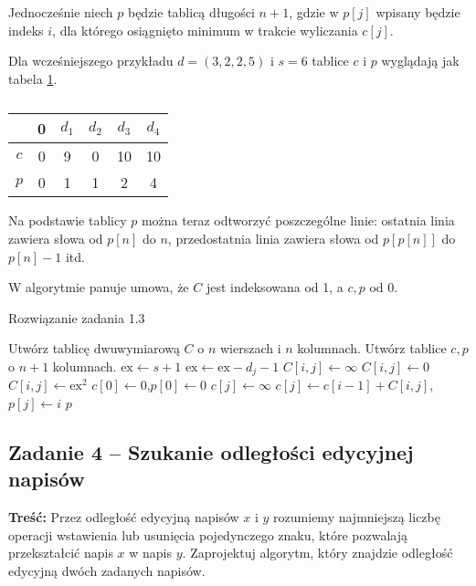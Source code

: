 Jednocześnie niech $p$ będzie tablicą długości $n+1$, gdzie w $p[j]$ wpisany będzie indeks $i$, dla którego osiągnięto minimum w trakcie wyliczania $c[j]$.

Dla wcześniejszego przykładu $d=(3,2,2,5)$ i $s=6$ tablice $c$ i $p$ wyglądają jak tabela \ref{tab_zad13_c}.
\begin{table}[H]
	\centering
	\def\arraystretch{1.25}
	\begin{tabular}{|c|ccccc|}
		\hline & \multicolumn{1}{c|}{0} & \multicolumn{1}{c|}{$d_1$} & \multicolumn{1}{c|}{$d_2$} & \multicolumn{1}{c|}{$d_3$} & \multicolumn{1}{c|}{$d_4$} \\ \hline
		$c$ & 0 & 9 & 0 & 10 & 10 \\ \cline{1-1}
		$p$ & 0 & 1 & 1 & 2 & 4 \\ \cline{1-1}
		\hline
	\end{tabular}
	\caption{}
	\label{tab_zad13_c}
\end{table}

Na podstawie tablicy $p$ można teraz odtworzyć poszczególne linie: ostatnia linia zawiera słowa od $p[n]$ do $n$, przedostatnia linia zawiera słowa od $p[p[n]]$ do $p[n]-1$ itd.

W algorytmie panuje umowa, że $C$ jest indeksowana od 1, a $c,p$ od 0.
\begin{algorithm}[H]
	\caption{Rozwiązanie zadania 1.3}\label{Zadanie13}
	\begin{algorithmic}[1]
			\State Utwórz tablicę dwuwymiarową $C$ o $n$ wierszach i $n$ kolumnach.
			\State Utwórz tablice $c,p$ o $n+1$ kolumnach.
				\State $\textrm{ex}\gets s+1$
					\State $\textrm{ex}\gets \textrm{ex} - d_j - 1$
						\State $C[i,j]\gets\infty$
						\State $C[i,j]\gets0$
					\Else
						\State $C[i,j]\gets\textrm{ex}^2$
					\EndIf
				\EndFor
			\EndFor
			\State $c[0]\gets0$,\quad$p[0]\gets0$
				\State $c[j]\gets\infty$
						\State $c[j]\gets c[i-1]+C[i,j]$,\qquad$p[j]\gets i$
					\EndIf
				\EndFor
			\EndFor
			\State \Return $p$
		\EndProcedure
	\end{algorithmic}
\end{algorithm}

\subsection{Zadanie 4 -- Szukanie odległości edycyjnej napisów}
\textbf{Treść:} Przez odległość edycyjną napisów 
$x$ i $y$ rozumiemy najmniejszą liczbę operacji wstawienia lub usunięcia
pojedynczego znaku, które pozwalają przekształcić napis $x$ w napis $y$.
Zaprojektuj algorytm, który znajdzie odległość 
edycyjną dwóch zadanych napisów.

